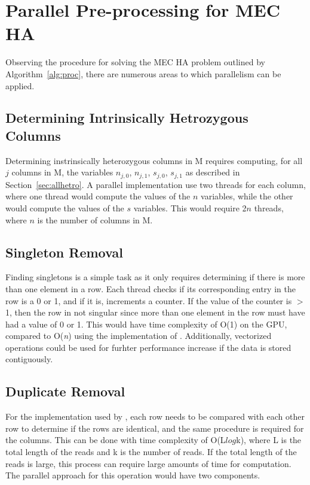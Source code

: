 \documentclass[10pt,twocolumn]{article}
\begin{document}
\section{Parallel Pre-processing for MEC HA } \label{sec:parpre}

Observing the procedure for solving the MEC HA problem outlined by Algorithm~\ref{alg:proc}, there are 
numerous areas to which parallelism can be applied.

\subsection{ Determining Intrinsically Hetrozygous Columns}

Determining instrinsically heterozygous columns in M requires computing, for all $j$ columns in M, the
variables $n_{j,0}$, $n_{j,1}$, $s_{j,0}$, $s_{j,1}$ as described in Section~\ref{sec:allhetro}.
A parallel implementation use two threads for each column, where one thread would compute the values of the
$n$ variables, while the other would compute the values of the $s$ variables. This would require 2$n$ threads,
where $n$ is the number of columns in M.

\subsection{Singleton Removal}

Finding singletons is a simple task as it only requires determining if there is more than one element in a
row. Each thread checks if  its corresponding entry in the row is a 0 or 1, and if it is, increments a
counter. If the value of the counter is $>$ 1, then the row in not singular since more than one element in 
the row must have had a value of 0 or 1. This would have time complexity of O(1) on the GPU, compared to 
O(\textit{n}) using the implementation of \cite{chen:2013}. Additionally, vectorized operations could be used
for furhter performance increase if the data is stored contiguously.

\subsection{Duplicate Removal}

For the implementation used by \cite{chen:2013}, each row needs to be compared with each other row to
determine if the rows are identical, and the same procedure is required for the columns. This can be done with
time complexity of O(L$log$k), where L is the total length of the reads and k is the number of reads. If the
total length of the reads is large, this process can require large amounts of time for computation. The 
parallel approach for this operation would have two components.
\end{document}
